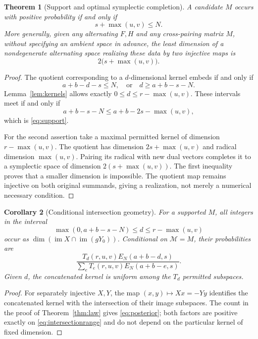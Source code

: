 \documentclass[11pt]{article}
\numberwithin{equation}{section}
\newtheorem{theorem}{Theorem}[section]
\newtheorem{corollary}[theorem]{Corollary}
\theoremstyle{definition}
\theoremstyle{remark}
\newcommand{\im}{\operatorname{im}}
\begin{document}
\begin{theorem}[Support and optimal symplectic completion]\label{thm:support}
A candidate $M$ occurs with positive probability if and only if
\begin{equation}\label{eq:support}
 \boxed{s+\max(u,v)\le N.}
\end{equation}
More generally, given any alternating $F,H$ and any cross-pairing matrix $M$, without specifying an ambient space in advance, the least dimension of a nondegenerate alternating space realizing these data by two injective maps is
\begin{equation}\label{eq:minimal}
 \boxed{2\bigl(s+\max(u,v)\bigr).}
\end{equation}
\end{theorem}
\begin{proof}
The quotient corresponding to a $d$-dimensional kernel embeds if and only if
\[
 a+b-d-s\le N,
 \quad\text{or}\quad d\ge a+b-s-N.
\]
Lemma~\ref{lem:kernels} allows exactly $0\le d\le r-\max(u,v)$. These intervals meet if and only if
\[
 a+b-s-N\le a+b-2s-\max(u,v),
\]
which is \eqref{eq:support}.

For the second assertion take a maximal permitted kernel of dimension $r-\max(u,v)$. The quotient has dimension $2s+\max(u,v)$ and radical dimension $\max(u,v)$. Pairing its radical with new dual vectors completes it to a symplectic space of dimension $2(s+\max(u,v))$. The first inequality proves that a smaller dimension is impossible. The quotient map remains injective on both original summands, giving a realization, not merely a numerical necessary condition.
\end{proof}

\begin{corollary}[Conditional intersection geometry]\label{cor:intersection}
For a supported $M$, all integers in the interval
\begin{equation}\label{eq:intersectionrange}
 \max(0,a+b-s-N)\le d\le r-\max(u,v)
\end{equation}
occur as $\dim(\im X\cap\im(gY_0))$. Conditional on $\mathcal M=M$, their probabilities are
\begin{equation}\label{eq:posterior}
 \frac{T_d(r,u,v)E_N(a+b-d,s)}
 {\sum_eT_e(r,u,v)E_N(a+b-e,s)}.
\end{equation}
Given $d$, the concatenated kernel is uniform among the $T_d$ permitted subspaces.
\end{corollary}
\begin{proof}
For separately injective $X,Y$, the map $(x,y)\mapsto Xx=-Yy$ identifies the concatenated kernel with the intersection of their image subspaces. The count in the proof of Theorem~\ref{thm:law} gives \eqref{eq:posterior}; both factors are positive exactly on \eqref{eq:intersectionrange} and do not depend on the particular kernel of fixed dimension.
\end{proof}
\end{document}
